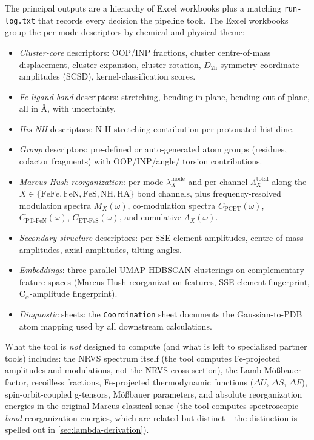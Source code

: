 \documentclass[10pt,a4paper,twoside]{article}
\newcommand{\PCET}{\mathrm{PCET}}
\newcommand{\ET}{\mathrm{ET}}
\newcommand{\PT}{\mathrm{PT}}
\newcommand{\file}[1]{\texttt{#1}}
\begin{document}
The principal outputs are a hierarchy of Excel workbooks plus a
matching \file{run-log.txt} that records every decision the
pipeline took. The Excel workbooks group the per-mode descriptors by
chemical and physical theme:

\begin{itemize}
  \item \emph{Cluster-core} descriptors: OOP/INP fractions, cluster
        centre-of-mass displacement, cluster expansion, cluster
        rotation, $D_{2\mathrm{h}}$-symmetry-coordinate amplitudes
        (SCSD), kernel-classification scores.
  \item \emph{Fe-ligand bond} descriptors: stretching, bending
        in-plane, bending out-of-plane, all in \AA{}, with uncertainty.
  \item \emph{His-NH} descriptors: N-H stretching contribution per
        protonated histidine.
  \item \emph{Group} descriptors: pre-defined or auto-generated atom
        groups (residues, cofactor fragments) with OOP/INP/angle/
        torsion contributions.
  \item \emph{Marcus-Hush reorganization}: per-mode
        $\lambda_X^{\text{mode}}$ and per-channel
        $\Lambda_X^{\text{total}}$ along the
        $X \in \{\text{FeFe}, \text{FeN}, \text{FeS}, \text{NH},
                \text{HA}\}$ bond channels, plus frequency-resolved
        modulation spectra $M_X(\omega)$, co-modulation spectra
        $C_{\PCET}(\omega)$, $C_{\PT\text{-FeN}}(\omega)$,
        $C_{\ET\text{-FeS}}(\omega)$, and cumulative
        $\Lambda_X(\omega)$.
  \item \emph{Secondary-structure} descriptors: per-SSE-element
        amplitudes, centre-of-mass amplitudes, axial amplitudes,
        tilting angles.
  \item \emph{Embeddings}: three parallel UMAP-HDBSCAN clusterings on
        complementary feature spaces (Marcus-Hush reorganization
        features, SSE-element fingerprint, C$_\alpha$-amplitude
        fingerprint).
  \item \emph{Diagnostic} sheets: the \texttt{Coordination} sheet
        documents the Gaussian-to-PDB atom mapping used by all
        downstream calculations.
\end{itemize}

What the tool is \emph{not} designed to compute (and what is left
to specialised partner tools) includes: the NRVS spectrum itself
(the tool computes Fe-projected amplitudes and modulations, not the
NRVS cross-section), the Lamb-M\"o\ss bauer factor, recoilless
fractions, Fe-projected thermodynamic functions
($\Delta U$, $\Delta S$, $\Delta F$), spin-orbit-coupled
g-tensors, M\"o\ss bauer parameters, and absolute reorganization
energies in the original Marcus-classical sense (the tool computes
spectroscopic \emph{bond} reorganization energies, which are related
but distinct -- the distinction is spelled out in
\cref{sec:lambda-derivation}).
\end{document}
